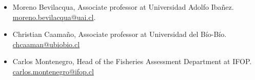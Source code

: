 \documentclass[10pt,a4paper]{article}
\begin{document}

\begin{itemize}
\item Moreno Bevilacqua, Associate professor at Universidad Adolfo Ibañez.  \href{mailto:moreno.bevilacqua@uai.cl}{moreno.bevilacqua@uai.cl}.
\item Christian Caamaño, Associate professor at Universidad del Bío-Bío. 
\href{mailto:chcaaman@ubiobio.cl}{chcaaman@ubiobio.cl} 
\item Carlos Montenegro, Head of the Fisheries Assessment Department at IFOP.
\href{mailto:carlos.montenegro@ifop.cl}{carlos.montenegro@ifop.cl}
\end{itemize}
\end{document}
